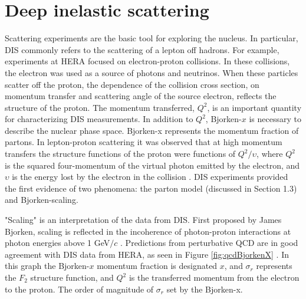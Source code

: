 \section{Deep inelastic scattering}

Scattering experiments are the basic tool for exploring the nucleus. In particular, DIS commonly refers to the scattering of a lepton off hadrons. For example, experiments at HERA focused on electron-proton collisions. In these collisions, the electron was used as a source of photons and neutrinos. When these particles scatter off the proton, the dependence of the collision cross section, on momentum transfer and scattering angle of the source electron, reflects the structure of the proton. The momentum transferred, $Q^2$, is an important quantity for characterizing DIS measurements. In addition to $Q^2$, Bjorken-$x$ is necessary to describe the nuclear phase space. Bjorken-x represents the momentum fraction of partons. In lepton-proton scattering it was observed that at high momentum transfers the structure functions of the proton were functions of $Q^2/\upsilon$, where $Q^2$ is the squared four-momentum of the virtual photon emitted by the electron, and $\upsilon$ is the energy lost by the electron in the collision \cite{Bjorken:1968dy}. DIS experiments provided the first evidence of two phenomena: the parton model (discussed in Section 1.3) and Bjorken-scaling. 

"Scaling" is an interpretation of the data from DIS. First proposed by James Bjorken, scaling is reflected in the incoherence of photon-proton interactions at photon energies above 1 GeV$/c$ \cite{Bjorken:1982qr}. Predictions from perturbative QCD are in good agreement with DIS data from HERA, as seen in Figure \ref{fig:qcdBjorkenX} \cite{Shimizu:2009fc}. In this graph the Bjorken-$x$ momentum fraction is designated $x$, and $\sigma_r$ represents the $F_2$ structure function, and $Q^2$ is the transferred momentum from the electron to the proton. The order of magnitude of $\sigma_r$ set by the Bjorken-x.

